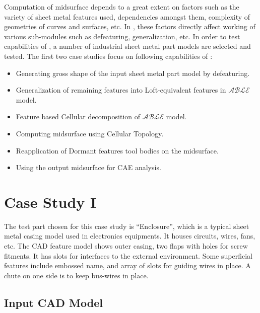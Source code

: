 Computation of midsurface depends to a great extent on factors such as the variety of sheet metal features used, dependencies amongst them, complexity of geometries of curves and surfaces, etc. In \mysystemname, these factors directly affect working of various sub-modules such as defeaturing, generalization, etc.
In order to test capabilities of \mysystemname, a number of industrial sheet metal part models are selected and tested.
The first two case studies focus on following capabilities of \mysystemname:
\begin{itemize}[noitemsep,topsep=2pt,parsep=2pt,partopsep=2pt]
\item Generating gross shape of the input sheet metal part model by defeaturing.
\item Generalization of remaining features into Loft-equivalent features in $\mathcal{ABLE}$ model.
\item Feature based Cellular decomposition of $\mathcal{ABLE}$ model.
\item Computing midsurface using Cellular Topology.
\item Reapplication of Dormant features tool bodies on the midsurface.
\item Using the output midsurface for CAE analysis.
\end{itemize}

\section{Case Study I}

The test part chosen for this case study is ``Enclosure'', which is a typical sheet metal casing model used in electronics equipments. It houses circuits, wires, fans, etc.  The CAD feature model shows outer casing, two flaps with holes for screw fitments. It has slots for interfaces to the external environment. Some superficial features include embossed name, and array of slots for guiding wires in place. A chute on one side is to keep bus-wires in place. 


\subsection{Input CAD Model}



